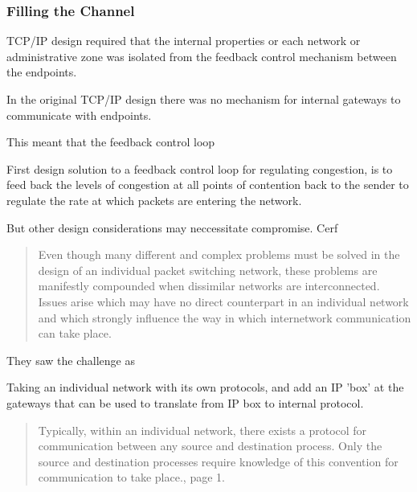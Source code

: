 \subsubsection{Filling the Channel}

TCP/IP design required that the internal properties or each network or administrative zone was
isolated from the feedback control mechanism between the endpoints.

In the original TCP/IP design there was no mechanism for internal gateways to communicate with
endpoints.

This meant that the feedback control loop  

%
%
%
%
%
%

First design solution to a feedback control loop for regulating congestion, is to feed back the
levels of congestion at all points of contention back to the sender to regulate the rate at which
packets are entering the network.

%

But other design considerations may neccessitate compromise. Cerf\cite{cerf1974}

\begin{quote}
Even though many different and complex problems must be solved in the design of an individual packet
switching network, these problems are manifestly compounded when dissimilar networks are
interconnected. Issues arise which may have no direct counterpart in an individual network and
which strongly influence the way in which internetwork communication can take place.
\end{quote}

They saw the challenge as 

Taking an individual network with its own protocols, and add an IP 'box' at the gateways that can be
used to translate from IP box to internal protocol.

\begin{quote}
    Typically, within an individual network, there exists a protocol for communication between any
    source and destination process. Only the source and destination processes require knowledge of
    this convention for communication to take place.\cite{cerf1974}, page 1.
\end{quote}

